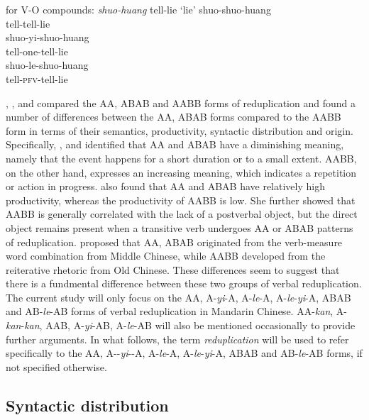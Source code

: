 \ex\label{ex:forms-vo} for V-O compounds: \textit{shuo-huang} tell-lie `lie'
		\ea \gll shuo-shuo-huang\\
		tell-tell-lie\\ 
		\ex \gll shuo-yi-shuo-huang\\
		tell-one-tell-lie\\ 
		\ex \gll shuo-le-shuo-huang\\
		tell-\textsc{pfv}-tell-lie\\ 
		\z
\z




 \citet{Fan1964}, \citet{Arcodiaetal2014}, \citet{MelloniBasciano2018} and \citet{Xie2020} compared the AA, ABAB and AABB forms of reduplication 
and found a number of differences between the AA, ABAB forms compared to the AABB form in terms of their semantics, productivity, syntactic distribution and origin. 
Specifically, \citet{Arcodiaetal2014}, \citet{MelloniBasciano2018} and \citet{Xie2020} identified that AA and ABAB have a diminishing meaning, 
namely that the event happens for a short duration or to a small extent. 
AABB, on the other hand, expresses an increasing meaning, which indicates a repetition or action in progress. 
\citet{Xie2020} also found that AA and ABAB have relatively high productivity, 
whereas the productivity of AABB is low. 
She further showed that AABB is generally correlated with the lack of a postverbal object, but the direct object remains present when a transitive verb undergoes AA or ABAB patterns of reduplication. 
\citet[277]{Fan1964} proposed that AA, ABAB originated from the verb-measure word combination from Middle Chinese, 
while AABB developed from the reiterative rhetoric from Old Chinese. 
These differences seem to suggest that there is a fundmental difference between these two groups of verbal reduplication. 
The current study will only focus on the AA, A-\textit{yi}-A, A-\textit{le}-A, A-\textit{le}-\textit{yi}-A, ABAB and AB-\textit{le}-AB forms of verbal reduplication in Mandarin Chinese.
AA-\textit{kan}, A-\textit{kan}-\textit{kan}, AAB, A-\textit{yi}-AB, A-\textit{le}-AB will also be mentioned occasionally to provide further arguments.
In what follows, the term \textit{reduplication} will be used  to refer specifically to the AA, A\hyp{}-\textit{yi}\hyp{}-A, A-\textit{le}-A, A-\textit{le}-\textit{yi}-A, ABAB and AB-\textit{le}-AB forms, if not specified otherwise.




\subsection{Syntactic distribution}\label{sec:syn-dis}

